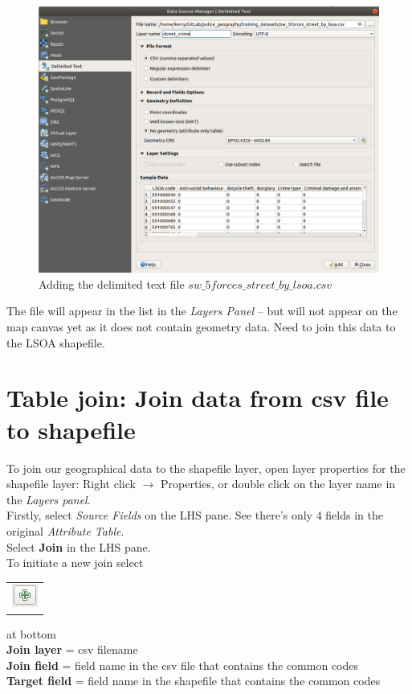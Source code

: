 \begin{figure}[!h]
      	\centering
      	\includegraphics[width=1\textwidth]{images/data_source_manager_window_delimited_text.png}
      	\caption{Adding the delimited text file $sw\_5forces\_street\_by\_lsoa.csv$}
      	\label{ft_fig_firstfig3}
\end{figure}
        
The file will appear in the list in the \textit{Layers Panel} – but will not appear on the map canvas yet as it does not contain geometry data.
Need to join this data to the LSOA shapefile.

\null\newpage

\section{Table join: Join data from csv file to shapefile}
To join our geographical data to the shapefile layer, open layer properties for the shapefile layer: Right click $\rightarrow$ Properties, or double click on the layer name in the \textit{Layers panel}.\\

Firstly, select \textit{Source Fields} on the LHS pane. See there's only 4 fields in the original \textit{Attribute Table}.\\

Select \textbf{Join} in the LHS pane.\\
To initiate a new join select 
\begin{tabular}{@{}c@{}}\includegraphics[width=4ex]{images/green_button_icon.png}\end{tabular}
at bottom\\
\textbf{Join layer} = csv filename\\
\textbf{Join field} = field name in the csv file that contains the common codes\\
\textbf{Target field} = field name in the shapefile that contains the common codes\\

